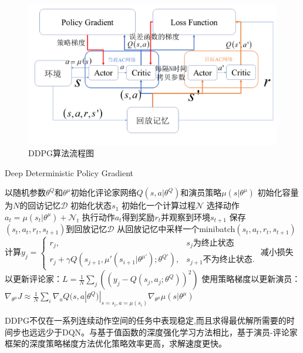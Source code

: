 \begin{figure}[htb]
  \centering
  \includegraphics[width=\textwidth]{figures/ddpg.png}
  \caption{DDPG算法流程图}\label{ddpg}
\end{figure}

\begin{algorithm}[htb]
\caption{Deep Deterministic Policy Gradient}
\label{ddpgalgorithm}
\begin{algorithmic}[1]
\State 以随机参数$\theta^Q$和$\theta^\mu$初始化评论家网络$Q(s,a|\theta^Q)$和演员策略$\mu(s|\theta^\mu)$
\State 初始化容量为$N$的回访记忆$\mathcal{D}$
    \State 初始化状态$s_1$
    \State 初始化一个计算过程$\mathcal{N}$
        \State 选择动作$a_t = \mu(s_t|\theta^\mu) + \mathcal{N}_t$
        \State 执行动作$a_t$得到奖励$r_t$并观察到环境$s_{t+1}$
        \State 保存$(s_t, a_t, r_t, s_{t+1})$到回放记忆$\mathcal{D}$
        \State 从回放记忆中采样一个minibatch$(s_t, a_t, r_t, s_{t+1})$
        \State 计算$y_j = \begin{cases} r_j,  & \text{$s_j$为终止状态} \\ r_j + \gamma Q(s_{j+1}, \mu'(s_{i+1}|\theta^{\mu'}); \theta^{Q'}), & \text{$s_{j+1}$不为终止状态}. \end{cases}$
        \State 减小损失以更新评论家：$L = \frac{1}{N}\sum_j ((y_j - Q(s_j, a_j; \theta^Q))^2)$
        \State 使用策略梯度以更新演员：$\nabla_{\theta^\mu} J \approx \frac{1}{N} \sum_i \nabla_a Q(s,a|\theta^Q)|_{s=s_i,a=\mu(s_i)} \nabla_{\theta^\mu} \mu(s|\theta^\mu)$
    \EndFor
\EndFor
\end{algorithmic}
\end{algorithm}

DDPG不仅在一系列连续动作空间的任务中表现稳定,而且求得最优解所需要的时间步也远远少于DQN。与基于值函数的深度强化学习方法相比，基于演员-评论家框架的深度策略梯度方法优化策略效率更高，求解速度更快。


